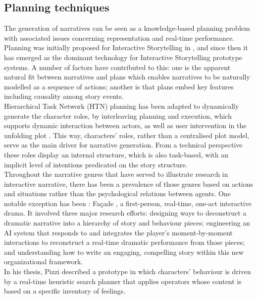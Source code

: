 \documentclass[11pt]{article}
\begin{document}
\subsection{Planning techniques}
The generation of narratives can be seen as a knowledge-based planning problem with associated issues concerning representation and real-time performance. Planning was initially proposed for Interactive Storytelling in \cite{Young99}, and since then it has emerged as the dominant technology for Interactive Storytelling prototype systems. A number of factors have contributed to this: one is the apparent natural fit between narratives and plans which enables narratives to be naturally modelled as a sequence of actions; another is that plans embed key features including causality among story events.\\

Hierarchical Task Network (HTN) planning \cite{Erol94} has been adapted to dynamically generate the character roles, by interleaving planning and execution, which supports dynamic interaction between actors, as well as user intervention in the unfolding plot \cite{Cavazza02}. This way, characters’ roles, rather than a centralised plot model, serve as the main driver for narrative generation. From a technical perspective these roles display an internal structure, which is also task-based, with an implicit level of intentions predicated on the story structure.\\

Throughout the narrative genres that have served to illustrate research in interactive narrative, there has been a prevalence of those genres based on actions and situations rather than the psychological relations between agents. One notable exception has been : Fa\c cade \cite{Mateas05}, a first-person, real-time, one-act interactive drama. It involved three major research efforts: designing ways to deconstruct a dramatic narrative into a hierarchy of story and behaviour pieces; engineering an AI system that responds to and integrates the player’s moment-by-moment interactions to reconstruct a real-time dramatic performance from those pieces; and understanding how to write an engaging, compelling story within this new organizational framework.\\
In his thesis, Pizzi \cite{Pizzi11} described a prototype in which characters’ behaviour is driven by a real-time heuristic search planner that applies operators whose content is based on a specific inventory of feelings.\\
\end{document}
